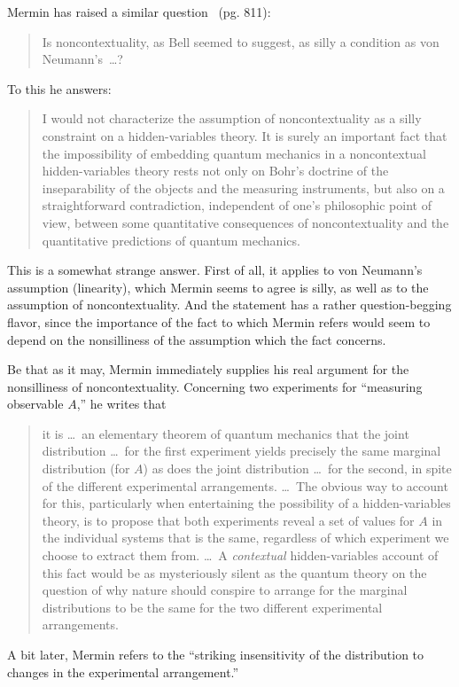 \documentclass[12pt]{article}
\begin{document}
Mermin has raised a similar question~\cite{merm93} (pg. 811):
\begin{quotation}\small\noindent
   Is noncontextuality, as Bell seemed to suggest, as silly a condition
   as von Neumann's~\dots?
\end{quotation}
To this he answers:
\begin{quotation}\small\noindent
   I would not characterize the assumption of noncontextuality as a
   silly constraint on a hidden-variables theory. It is surely an
   important fact that the impossibility of embedding quantum mechanics
   in a noncontextual hidden-variables theory rests not only on Bohr's
   doctrine of the inseparability of the objects and the measuring
   instruments, but also on a straightforward contradiction,
   independent of one's philosophic point of view, between some
   quantitative consequences of noncontextuality and the quantitative
   predictions of quantum mechanics.
\end{quotation}
This is a somewhat strange answer. First of all, it applies to von
Neumann's assumption (linearity), which Mermin seems to agree is
silly, as well as to the assumption of noncontextuality. And the
statement has a rather question-begging flavor, since the importance
of the fact to which Mermin refers would seem to depend on the
nonsilliness of the assumption which the fact concerns.

Be that as it may, Mermin immediately supplies his real argument for
the nonsilliness of noncontextuality. Concerning two experiments for
``measuring observable $A$,'' he writes that
\begin{quotation}\small\noindent
   it is \dots\ an elementary theorem of quantum mechanics that the
   joint distribution \dots\ for the first experiment yields precisely
   the same marginal distribution (for $A$) as does the joint
   distribution \dots\ for the second, in spite of the different
   experimental arrangements. \dots\ The obvious way to account for
   this, particularly when entertaining the possibility of a
   hidden-variables theory, is to propose that both experiments reveal
   a set of values for $A$ in the individual systems that is the same,
   regardless of which experiment we choose to extract them {}from.
   \dots\ A {\it contextual} hidden-variables account of this fact
   would be as mysteriously silent as the quantum theory on the
   question of why nature should conspire to arrange for the marginal
   distributions to be the same for the two different experimental
   arrangements.
\end{quotation}
A bit later, Mermin refers to the ``striking insensitivity of the
distribution to changes in the experimental arrangement.''
\end{document}

